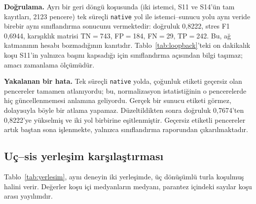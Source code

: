 \documentclass[conference]{IEEEtran}
\begin{document}
\textbf{Doğrulama.} Ayrı bir geri döngü koşusunda (iki istemci, S11 ve S14'ün
tam kayıtları, 2123 pencere) tek süreçli \texttt{native} yol ile
istemci--sunucu yolu aynı veride birebir aynı sınıflandırma sonucunu
vermektedir: doğruluk 0{,}8222, stres F1 0{,}6944, karışıklık matrisi
TN$=$743, FP$=$184, FN$=$29, TP$=$242. Bu, ağ katmanının hesabı bozmadığının
kanıtıdır. Tablo~\ref{tab:loopback}'teki on dakikalık koşu S11'in yalnızca
başını kapsadığı için sınıflandırma açısından bilgi taşımaz; amacı zamanlama
ölçümüdür.

\textbf{Yakalanan bir hata.} Tek süreçli \texttt{native} yolda, çoğunluk etiketi
geçersiz olan pencereler tamamen atlanıyordu; bu, normalizasyon istatistiğinin o
pencerelerde hiç güncellenmemesi anlamına geliyordu. Gerçek bir sunucu etiketi
görmez, dolayısıyla böyle bir atlama yapamaz. Düzeltildikten sonra doğruluk
0{,}7674'ten 0{,}8222'ye yükselmiş ve iki yol birbirine eşitlenmiştir. Geçersiz
etiketli pencereler artık baştan sona işlenmekte, yalnızca sınıflandırma
raporundan çıkarılmaktadır.

\subsection{Uç--sis yerleşim karşılaştırması}

Tablo~\ref{tab:yerlesim}, aynı deneyin iki yerleşimde, üç dönüşümlü turla
koşulmuş halini verir. Değerler koşu içi medyanların medyanı, parantez içindeki
sayılar koşu arası yayılımdır.
\end{document}
